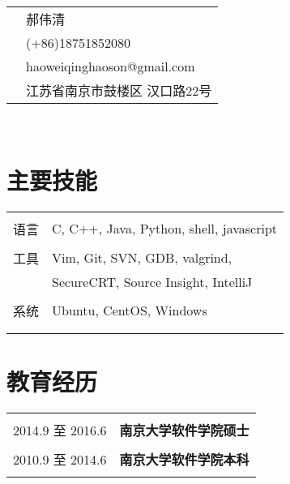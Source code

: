 \documentclass[10pt]{article} %
\begin{document}
\hfill
\begin{minipage}[t]{0.32\textwidth} %
\vspace{0pt} %

\colorbox{shade}{\textcolor{text1}{
\begin{tabular}{c|p{6cm}}
\raisebox{0pt} & 郝伟清 \\ %
\raisebox{-3pt}{\Mobilefone} &  (+86)18751852080 \\ %
\raisebox{-1pt}{\Letter} & haoweiqinghaoson@gmail.com \\ %
\raisebox{-4pt}{\textifsymbol{18}} & 江苏省南京市鼓楼区 汉口路22号 \\ %
\end{tabular}
}
}\\[10pt]



\section{主要技能} 

\begin{tabular}{rl}
& \\
语言
& C, C++, Java, Python, shell, javascript\\
& \\
工具
& Vim, Git, SVN, GDB, valgrind, \\
& SecureCRT, Source Insight, IntelliJ\\
& \\
系统
& Ubuntu, CentOS, Windows\\
& \\ \\
\end{tabular}

\section{教育经历} 

\begin{tabular}{rl}
& \\
2014.9 至 2016.6  & \textbf{南京大学软件学院硕士}\\
& \\
2010.9 至 2014.6  & \textbf{南京大学软件学院本科}\\ 
& \\
\end{tabular}\\[10pt]


\end{minipage}
\end{document}
